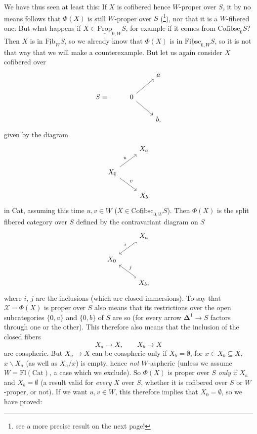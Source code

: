 \documentclass[11pt]{article}
\newcommand{\printedpage}[1]{\marginpar{\footnotesize p.~#1}}
\newcommand{\msp}[1]{\marginpar{\footnotesize [#1]}}
\newcommand{\Fib}{\underline{\mathrm{Fib}}}
\newcommand{\Prop}{\underline{\mathrm{Prop}}}
\newcommand{\Cofibsc}{\underline{\mathrm{Cofibsc}}}
\newcommand{\Fibsc}{\underline{\mathrm{Fibsc}}}
\newcommand{\margbar}{\marginpar{\(\|\)}}
\begin{document}
\printedpage{118}
\msp{page 191}
\margbar We have thus seen at least this: If $X$ is cofibered hence $W$-proper over $S$, it by no means follows that $\Phi(X)$ is still $W$-proper over $S$ (\footnote{see a more precise result on the next page!}), nor that it is a $W$-fibered one. But what happens if $X \in \Prop_{0,W}S$, for example if it comes from $\Cofibsc_0 S$? Then $X$ is in $\Fib_W S$, so we already know that $\Phi(X)$ is in $\Fibsc_{0,W}S$, so it is not that way that we will make a counterexample. But let us again consider $X$ cofibered over
\[
\begin{tikzcd}
 & & a \\
S = & 0 \arrow[ur] \arrow[dr] & \\
 & & b,
\end{tikzcd}
\]
given by the diagram
\[
\begin{tikzcd}
 & X_a \\
X_0 \arrow[ur, "u"] \arrow[dr, "v"] & \\
 & X_b
\end{tikzcd}
\]
in Cat, assuming this time $u, v \in W$ ($X \in \Cofibsc_{0,W}S$). Then $\Phi(X)$ is the split fibered category over $S$ defined by the contravariant diagram on $S$
\[
\begin{tikzcd}
 & X_a \arrow[dl, hook, "i"'] \\
X_0 & \\
 & X_b, \arrow[ul, hook, "j"']
\end{tikzcd}
\]
where $i$, $j$ are the inclusions (which are closed immersions). To say that $\mathcal{X} = \Phi(X)$ is proper over $S$ also means that its restrictions over the open subcategories $\{0,a\}$ and $\{0,b\}$ of $S$ are so (for every arrow $\mathbf{\Delta}^1 \longrightarrow S$ factors through one or the other). This
\msp{page 192}
therefore also means that the inclusion of the closed fibers
\[ X_a \longrightarrow X, \qquad X_b \longrightarrow X \]
are coaspheric. But $X_a \longrightarrow X$ can be coaspheric only if $X_b = \emptyset$, for $x \in X_b \subseteq X$, $x\backslash X_a$ (as well as $X_a/x$) is empty, hence \textit{not} $W$-aspheric (unless we assume $W = \mathrm{Fl}(\mathrm{Cat})$, a case which we exclude). So $\Phi(X)$ is proper over $S$ \textit{only} if $X_a$ and $X_b = \emptyset$ (a result valid for \textit{every} $X$ over $S$, whether it is cofibered over $S$ or $W$-proper, or not). If we want $u, v \in W$, this therefore implies that $X_0 = \emptyset$, so we have proved:
\end{document}
